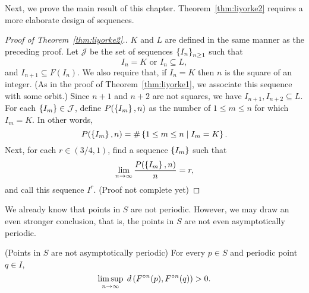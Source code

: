 \documentclass[12pt,draft,twoside]{book}
\begin{document}
Next, we prove the main result of this chapter.
Theorem~\ref{thm:liyorke2} requires a more elaborate design of sequences.
\begin{proof}[Proof of Theorem~\ref{thm:liyorke2}.]
  $K$ and $L$ are defined in the same manner as the preceding proof.
  Let $\mathcal{J}$ be the set of sequences $\left \{ I_n \right \}^{ }_{n\geq1}$ such that
  \begin{equation*}
    I_n = K \mbox{ or } I_n \subseteq L,
  \end{equation*}
  and $I_{n+1} \subseteq F(I_n)$.
  We also require that, if $I_n = K$ then $n$ is the square of an integer.
  (As in the proof of Theorem~\ref{thm:liyorke1}, we associate this sequence with some orbit.)
  Since $n+1$ and $n+2$ are not squares, we have $I_{n+1}, I_{n+2} \subseteq L$.
  For each $\left \{ I_m \right \} \in \mathcal{J}$, define $P(\left \{ I_m \right \},n)$ as the number of $1 \leq m \leq n$ for which $I_m = K$.
  In other words,
  \begin{equation*}
    P(\left \{ I_m \right \},n) = \#\left \{ 1 \leq m \leq n \mathrel{} \middle| \mathrel{} I_m = K \right \}.
  \end{equation*}
  Next, for each $r \in (3/4, 1)$, find a sequence $\left \{ I_m \right \}$ such that
  \begin{equation*}
    \lim\limits_{n\to \infty}\frac{P(\left \{ I_m \right \},n)}{n} = r,
  \end{equation*}
  and call this sequence $I^r$.
  (Proof not complete yet)
\end{proof}

We already know that points in $S$ are not periodic.
However, we may draw an even stronger conclusion, that is, the points in $S$ are not even asymptotically periodic.
\begin{theorem}
  (Points in $S$ are not asymptotically periodic)
  For every $p \in S$ and periodic point $q \in I$,
  \begin{equation*}
    \limsup\limits_{n \to \infty}\; d\left( F^{\circ n}(p) , F^{\circ n}(q) \right) > 0.
  \end{equation*}
  \label{thm:liyorke3}
\end{theorem}
\end{document}
